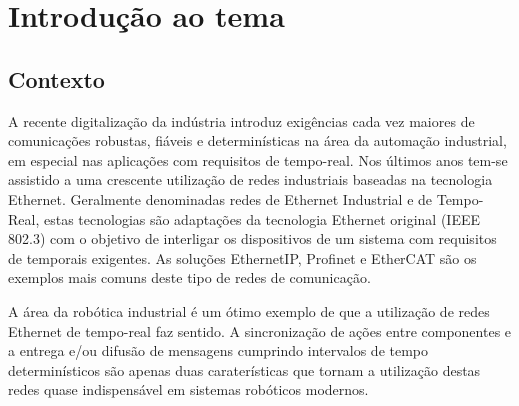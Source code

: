 \section{Introdução ao tema}\label{sec:intro}

%  

\subsection{Contexto}\label{sec:contexto}

A recente digitalização da indústria introduz exigências cada vez maiores de comunicações robustas, fiáveis e determinísticas na área da automação industrial, em especial nas aplicações com requisitos de tempo-real.
Nos últimos anos tem-se assistido a uma crescente utilização de redes industriais baseadas na tecnologia Ethernet. Geralmente denominadas redes de Ethernet Industrial e de Tempo-Real, estas tecnologias são adaptações
da tecnologia Ethernet original (IEEE 802.3) com o objetivo de interligar os dispositivos de um sistema com requisitos de temporais exigentes. As soluções EthernetIP, Profinet e EtherCAT são os exemplos mais comuns
deste tipo de redes de comunicação.

A área da robótica industrial é um ótimo exemplo de que a utilização de redes Ethernet de tempo-real faz sentido. A sincronização de ações entre componentes e a entrega e/ou difusão de mensagens cumprindo intervalos de tempo determinísticos são apenas duas
caraterísticas que tornam a utilização destas redes quase indispensável em sistemas robóticos modernos.

